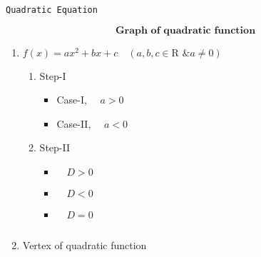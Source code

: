 \documentclass{article}
\begin{document}
\Large

\vspace*{\fill}
\begin{center}
{\LARGE{
\texttt{Quadratic Equation}
}}
\end{center}
\vspace*{\fill}


\pagebreak
\[
\textbf{Graph of quadratic function}
\]
\begin{enumerate}
\item $ f(x)=ax^2 + bx + c 
 \quad \left( a, b, c \in \text{R \& $a\neq0$} \right)$
 
 \pagebreak 
 \begin{enumerate}
 \item Step-I
	\begin{itemize}
	\item Case-I, $\quad a>0$
	\pagebreak
	\item Case-II, $\quad a<0$
	\end{itemize}
	\pagebreak
	\item Step-II
	\begin{itemize}
	\item $\quad D>0$
	\pagebreak
	\item $\quad D<0$
	\pagebreak
	\item $\quad D=0$
	\end{itemize}
\end{enumerate}	 
 $~$
 \pagebreak

\item Vertex of quadratic function
\begin{multicols}{2}
\begin{center}
\end{center}
\begin{center}
\end{center}
\begin{center}
\end{center}
\begin{center}
\end{center}
\end{multicols}

\pagebreak 
\vspace*{\fill}
\pagebreak $~$
\vspace*{\fill}
\pagebreak $~$
\vspace*{\fill}
\pagebreak $~$
\vspace*{\fill}

\end{enumerate}
\end{document}
